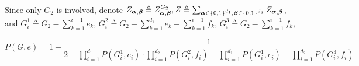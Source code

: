 Since only $G_2$ is involved, denote $Z_{\boldsymbol\alpha, \boldsymbol\beta} \triangleq Z_{\boldsymbol\alpha, \boldsymbol\beta}^{G_2}, Z \triangleq \sum_{\boldsymbol\alpha \in \left\{0,1\right\}^{d_1} , \boldsymbol\beta \in \left\{0,1\right\}^{d_2}} Z_{\boldsymbol\alpha, \boldsymbol\beta}$,
and
$G_i^1 \triangleq G_2 - \sum_{k=1}^{i-1} e_k$,
$G_i^2 \triangleq G_2 - \sum_{k=1}^{d_1}e_k - \sum_{k=1}^{i-1} f_k$,
$G_i^3 \triangleq G_2 - \sum_{k=1}^{i-1} f_k$,


\begin{Lem}
	
	\begin{equation}
	P(G,e) =  1 - \frac{1}{2 + \prod_{i=1}^{d_1} P(G_i^1, e_i) \cdot \prod_{i=1}^{d_2} P(G_i^2, f_i) - \prod_{i=1}^{d_1} P(G_i^1, e_i) - \prod_{i=1}^{d_2} P(G_i^3, f_i)}
		\label{recursion2}
	\end{equation}

\end{Lem}
